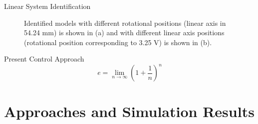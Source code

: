 \documentclass[10pt]{beamer}
\begin{document}
\begin{frame}{Linear System Identification}
  \begin{figure}[h]
    \centering %
    \qquad
    \caption{\label{fig:different_lin_angle} Identified models with different rotational positions (linear axis in 54.24 mm) is shown in (a) and with different linear axis positions (rotational position corresponding to 3.25 V) is shown in (b).}
  \end{figure}
\end{frame}

\begin{frame}{Present Control Approach}
  \begin{equation*}
    e = \lim_{n\to \infty} \left(1 + \frac{1}{n}\right)^n
  \end{equation*}
\end{frame}

\section{Approaches and Simulation Results}
\end{document}
